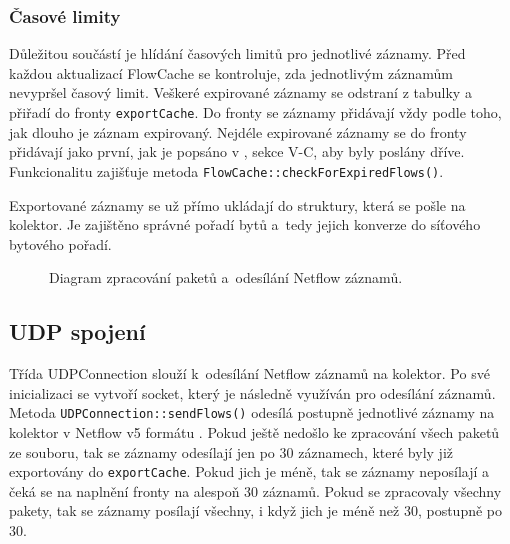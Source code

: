 \documentclass[a4paper, 11pt]{article}
\begin{document}
\begin{sloppypar}
\subsubsection*{Časové limity} \label{timelimits}
Důležitou součástí je hlídání časových limitů pro jednotlivé záznamy. Před každou aktualizací FlowCache se kontroluje, zda jednotlivým záznamům nevypršel časový limit. Veškeré expirované záznamy se odstraní z tabulky a přiřadí do fronty \verb|exportCache|. Do fronty se záznamy přidávají vždy podle toho, jak dlouho je záznam expirovaný. Nejdéle expirované záznamy se do fronty přidávají jako první, jak je popsáno v  \cite{flows}, sekce V-C, aby byly poslány dříve. Funkcionalitu zajišťuje metoda \texttt{FlowCache::checkForExpiredFlows()}.

Exportované záznamy se už přímo ukládají do struktury, která se pošle na kolektor. Je zajištěno správné pořadí bytů a~tedy jejich konverze do síťového bytového pořadí.


\begin{figure}[ht]
    \begin{center}
        \caption{Diagram zpracování paketů a~odesílání Netflow záznamů.}
        \label{fig1}
    \end{center}
\end{figure}


\subsection{UDP spojení}
Třída UDPConnection slouží k~odesílání Netflow záznamů na kolektor. Po své inicializaci se vytvoří socket, který je následně využíván pro odesílání záznamů. Metoda \texttt{UDPConnection::sendFlows()} odesílá postupně jednotlivé záznamy na kolektor v Netflow v5 formátu \cite{netflow5}. Pokud ještě nedošlo ke zpracování všech paketů ze souboru, tak se záznamy odesílají jen po 30 záznamech, které byly již exportovány do \verb|exportCache|. Pokud jich je méně, tak se záznamy neposílají a čeká se na naplnění fronty na alespoň 30 záznamů. Pokud se zpracovaly všechny pakety, tak se záznamy posílají všechny, i když jich je méně než 30, postupně po 30.


\end{sloppypar}
\end{document}
